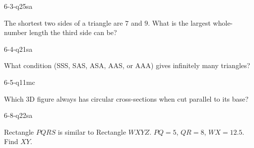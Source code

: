 \begin{practiceQuestion}{6-3-q25}{sa}
\begin{questionText}
The shortest two sides of a triangle are $7$ and $9$. What is the largest whole-number length the third side can be?
\end{questionText}
\end{practiceQuestion}

\begin{practiceQuestion}{6-4-q21}{sa}
\begin{questionText}
What condition (SSS, SAS, ASA, AAS, or AAA) gives infinitely many triangles?
\end{questionText}
\end{practiceQuestion}

\begin{practiceQuestion}{6-5-q11}{mc}
\begin{questionText}
Which 3D figure always has circular cross-sections when cut parallel to its base?
\end{questionText}
\end{practiceQuestion}

\begin{practiceQuestion}{6-8-q22}{sa}
\begin{questionText}
Rectangle $PQRS$ is similar to Rectangle $WXYZ$. $PQ = 5$, $QR = 8$, $WX = 12.5$. Find $XY$.
\end{questionText}
\end{practiceQuestion}

